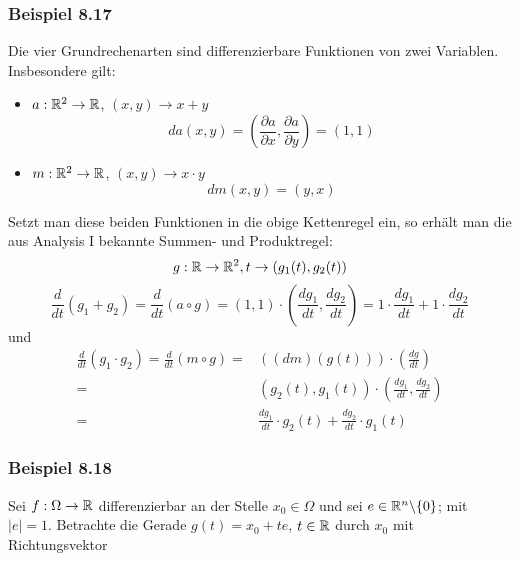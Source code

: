 \subsubsection*{Beispiel 8.17}
Die vier Grundrechenarten sind differenzierbare Funktionen von zwei Variablen. Insbesondere gilt:
\begin{itemize}
\item $a:\mathbb{R}^2\to\mathbb{R}$, $\left( x,y\right) \to x+y$ \[da\left( {x,y} \right) = \left( {\frac{{\partial a}}{{\partial x}},\frac{{\partial a}}{{\partial y}}} \right) = \left( {1,1} \right)\]
\item $m:\mathbb{R}^2\to \mathbb{R}$, $\left( x,y\right) \to x\cdot y$ \[dm\left( {x,y} \right) = \left( {y,x} \right)\]
\end{itemize}
Setzt man diese beiden Funktionen in die obige Kettenregel ein, so erhält man die aus Analysis I bekannte Summen- und Produktregel:
\[g:\mathbb{R}\to\mathbb{R}^2, t\to \left( g_1(t),g_2(t)\right)\]
\[\frac{d}{{dt}}\left( {{g_1} + {g_2}} \right) = \frac{d}{{dt}}\left( {a \circ g} \right) = \left( {1,1} \right) \cdot \left( {\frac{{d{g_1}}}{{dt}},\frac{{d{g_2}}}{{dt}}} \right) = 1\cdot \frac{{d{g_1}}}{{dt}} + 1\cdot \frac{{d{g_2}}}{{dt}}\]
und
\begin{align*}
\frac{d}{{dt}}\left( {{g_1} \cdot {g_2}} \right) = \frac{d}{{dt}}\left( {m \circ g} \right) = &\left( {\left( {dm} \right)\left( {g(t)} \right)} \right) \cdot \left( {\frac{{dg}}{{dt}}} \right)\\
= &\left( {{g_2}\left( t \right),{g_1}\left( t \right)} \right) \cdot \left( {\frac{{d{g_1}}}{{dt}},\frac{{d{g_2}}}{{dt}}} \right)\\
= &\frac{{d{g_1}}}{{dt}} \cdot {g_2}\left( t \right) + \frac{{d{g_2}}}{{dt}} \cdot {g_1}\left( t \right)
\end{align*}

\subsubsection*{Beispiel 8.18}
Sei $f:\Omega\to\mathbb{R}$ differenzierbar an der Stelle $x_0\in\Omega$ und sei $e\in\mathbb{R}^n\backslash\{ 0\}$; mit $\left| e\right|=1$. Betrachte die Gerade $g(t)=x_0+te$, $t\in\mathbb{R}$ durch $x_0$ mit Richtungsvektor

